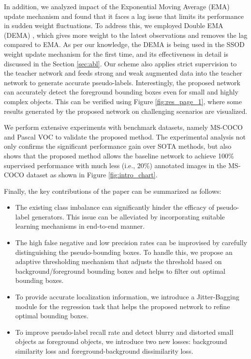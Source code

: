 \documentclass[10pt,twocolumn,letterpaper]{article}
\begin{document}
In addition, we analyzed impact of the Exponential Moving Average (EMA) update mechanism and found that it faces a lag issue that limits its performance in sudden weight fluctuations. To address this, we employed Double EMA (DEMA) \cite{DEMA2}, which gives more weight to the latest observations and removes the lag compared to EMA. As per our knowledge, the DEMA is being used in the SSOD weight update mechanism for the first time, and its effectiveness in detail is discussed in the Section \ref{sec:abl}. Our scheme also applies strict supervision to the teacher network and feeds strong and weak augmented data into the teacher network to generate accurate pseudo-labels. Interestingly, the proposed network can accurately detect the foreground bounding boxes even for small and highly complex objects. This can be verified using Figure \ref{fig:res_page_1}, where some results generated by the proposed network on challenging scenarios are visualized.

We perform extensive experiments with benchmark datasets, namely MS-COCO \cite{lin2014microsoft} and Pascal VOC \cite{pascal} to validate the proposed method. The experimental analysis not only confirms the significant performance gain over SOTA methods, but also shows that the proposed method allows the baseline network to achieve 100\% supervised performance with much less (i.e., 20\%) annotated images in the MS-COCO dataset as shown in Figure \ref{fig:intro_chart}.

Finally, the key contributions of the paper can be summarized as follows:
\begin{itemize}
    \item The existing class imbalance can significantly hinder the efficacy of pseudo-label generators. This issue can be alleviated by incorporating suitable learning mechanisms in end-to-end manner.
    \vspace{-0.7em}
    \item The high false negative and low precision rates can be improvised by carefully distinguishing the pseudo-bounding boxes. To handle this, we propose an adaptive thresholding mechanism that adjusts the threshold based on background/foreground bounding boxes and helps to filter out optimal bounding boxes.
    \vspace{-0.7em}
    \item To provide accurate localization information, we introduce a Jitter-Bagging module for the regression task that helps the proposed network to refine optimal bounding boxes.
    \vspace{-0.7em}
    \item To improve pseudo-label recall rate and detect blurry and distorted small objects as foreground objects, we introduce two new losses: background similarity loss and foreground-background dissimilarity loss.
\end{itemize}
\end{document}
